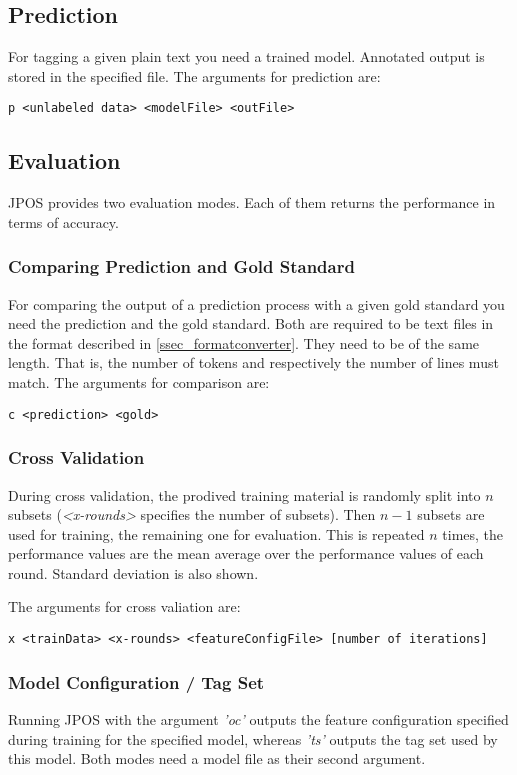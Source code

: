 \documentclass[11pt,a4paper,halfparskip]{scrartcl}
\begin{document}
\subsection{Prediction}
\label{sec_prediction}
For tagging a given plain text you need a trained model. Annotated output is stored in the specified file.
The arguments for prediction are:
\begin{verbatim}
p <unlabeled data> <modelFile> <outFile>
\end{verbatim}

\subsection{Evaluation}
JPOS provides two evaluation modes. Each of them returns the performance in terms of accuracy.

\subsubsection{Comparing Prediction and Gold Standard}
For comparing the output of a prediction process with a given gold
standard you need the prediction and the
gold standard. Both are required to be text files in the format
described in \ref{ssec_formatconverter}. They need to be of the same length. That is, the
number of tokens and respectively the number of lines must match.
The arguments for comparison are:
\begin{verbatim}
c <prediction> <gold>
\end{verbatim}




\subsubsection{Cross Validation}
During cross validation, the prodived training material is randomly
split into $n$ subsets (\textit{<x-rounds>} specifies the number of
subsets). Then $n-1$ subsets are used for training, the remaining one
for evaluation. This is repeated $n$ times, the performance values
are the mean average over the performance values of each
round. Standard deviation is also shown.

The arguments for cross valiation are:

\begin{verbatim}
x <trainData> <x-rounds> <featureConfigFile> [number of iterations]
\end{verbatim}


\subsubsection{Model Configuration / Tag Set}
Running JPOS with the argument \textit{'oc'} outputs the feature
configuration specified during training for the specified model, whereas \textit{'ts'} outputs the tag set used by this model. Both modes need a model file as their second argument.
\end{document}
